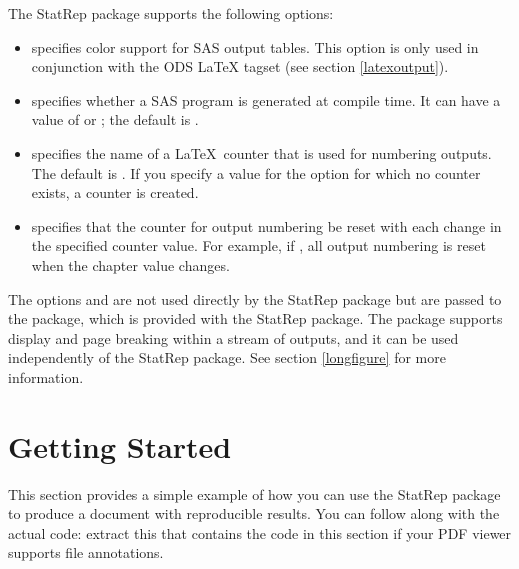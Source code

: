 \documentclass[article,oneside]{memoir}
\newcommand*{\StatRep}{\textsf{StatRep}\xspace}
\begin{document}
 The \StatRep package supports the following options:
     \begin{itemize}
     \item {} specifies color support for SAS output tables.
     This option is only used in conjunction with
     the ODS LaTeX tagset (see section \ref{latexoutput}).

     \item {} specifies whether a SAS program
     is generated at compile time. 
     It can have a value of  or ; the default is .

     \item {} specifies the name of a \LaTeX\ counter
     that is used for numbering outputs.
     The default is . If you specify a value for the 
     option for which no counter exists,
     a counter is created.

     \item {} specifies that the counter for output numbering be reset with
     each change in the specified counter value. For example, if ,
     all output numbering is reset when the chapter value changes.
     \end{itemize}

     The options  and  are not used directly by the \StatRep
     package but are passed to the  package, which
     is provided with the \StatRep package.
    The  package
    supports display and page breaking within a stream of outputs, and it can be
    used independently of the \StatRep package. See section \ref{longfigure} for
more information.

\chapter{Getting Started}\label{gs}

This section provides a simple example of how you can use the \StatRep package
to produce a document with reproducible results.
You can follow along with the actual code: extract this
 that
contains the code in this section if your PDF viewer supports file annotations.
\end{document}
